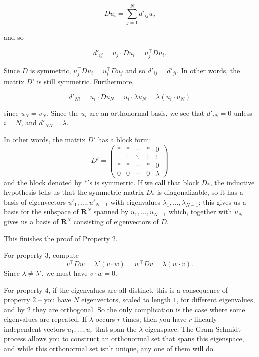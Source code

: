 \documentclass[
]{article}
\begin{document}
\[
Du_{i} = \sum_{j=1}^{N} d'_{ij} u_{j}
\]

and so

\[
d'_{ij} = u_{j}\cdot Du_{i} = u_{j}^{\intercal}Du_{i}.
\]

Since \(D\) is symmetric,
\(u_{j}^{\intercal}Du_{i} =u_{i}^{\intercal}Du_{j}\) and so
\(d'_{ij}=d'_{ji}\). In other words, the matrix \(D'\) is still
symmetric. Furthermore,

\[
d'_{Ni} = u_{i}\cdot Du_{N} = u_{i}\cdot \lambda u_{N} = \lambda (u_{i}\cdot u_{N})
\]

since \(u_{N}=v_{N}\). Since the \(u_{i}\) are an orthonormal basis, we
see that \(d'_{iN}=0\) unless \(i=N\), and \(d'_{NN}=\lambda\).

In other words, the matrix \(D'\) has a block form: \[
D' = \left(\begin{matrix} * & * & \cdots &*  & 0 \\ \vdots & \vdots & \ddots   & \vdots & \vdots \\
* & * & \cdots &*  & 0 \\
0 & 0 & \cdots &0 &\lambda \end{matrix}\right)
\] and the block denoted by \(*\)'s is symmetric. If we call that block
\(D_{*}\), the inductive hypothesis tells us that the symmetric matrix
\(D_{*}\) is diagonalizable, so it has a basis of eigenvectors
\(u'_{1},\ldots, u'_{N-1}\) with eigenvalues
\(\lambda_{1},\ldots, \lambda_{N-1}\); this gives us a basis for the
subspace of \(\mathbf{R}^{N}\) spanned by \(u_{1},\ldots, u_{N-1}\)
which, together with \(u_{N}\) gives us a basis of \(\mathbf{R}^{N}\)
consisting of eigenvectors of \(D\).

This finishes the proof of Property \(2\).

For property \(3\), compute \[
v^{\intercal}Dw = \lambda'(v\cdot w)=w^{\intercal}Dv = \lambda (w\cdot v).
\] Since \(\lambda\not=\lambda'\), we must have \(v\cdot w=0\).

For property \(4\), if the eigenvalues are all distinct, this is a
consequence of property \(2\) -- you have \(N\) eigenvectors, scaled to
length \(1\), for different eigenvalues, and by \(2\) they are
orthogonal. So the only complication is the case where some eigenvalues
are repeated. If \(\lambda\) occurs \(r\) times, then you have \(r\)
linearly independent vectors \(u_{1},\ldots, u_{r}\) that span the
\(\lambda\) eigenspace. The Gram-Schmidt process allows you to construct
an orthonormal set that spans this eigenspace, and while this
orthonormal set isn't unique, any one of them will do.
\end{document}
